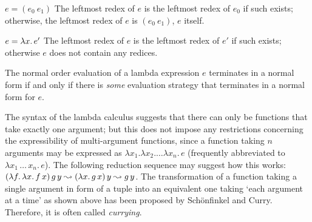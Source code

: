 {\begin{defn}
\begin{listcase}
\item[$e = (e_0\ e_1)$]
The leftmost redex of $e$ is the leftmost redex of $e_0$ if such exists;
otherwise, the leftmost redex of $e$ is $(e_0\ e_1)$, \IE $e$ itself.

\item[$e = {\lambda x.\,e'}$]
The leftmost redex of $e$ is the leftmost redex of $e'$ if such exists;
otherwise $e$ does not contain any redices.
\end{listcase}
\end{defn}

\begin{prop}
  The normal order evaluation of a lambda expression $e$ terminates in a normal
  form if and only if there is \emph{some} evaluation strategy that terminates
  in a normal form for $e$.
\end{prop}
}

\begin{rem}
\label{rem:multi-argument}
The syntax of the lambda calculus suggests that there can only be functions that
take exactly one argument; but this does not impose any restrictions concerning
the expressibility of multi-argument functions, since a function taking $n$
arguments may be expressed as $\lambda x_1.\lambda x_2.\ldots\lambda x_n.\,e$ (frequently abbreviated
to $\lambda x_1\,\ldots \,x_n.\, e$). The following reduction sequence may suggest how this
works: $({\lambda f.\,{\lambda x.\,f\,x}})\,g\,y \leadsto ({\lambda x.\,g\,x})\,
y \leadsto g\,y$. The transformation of a function taking a single argument in form of
a tuple into an equivalent one taking `each argument at a time' as shown above
has been proposed by Sch\"onfinkel and Curry. Therefore, it is often called
\emph{currying}.
\end{rem}

